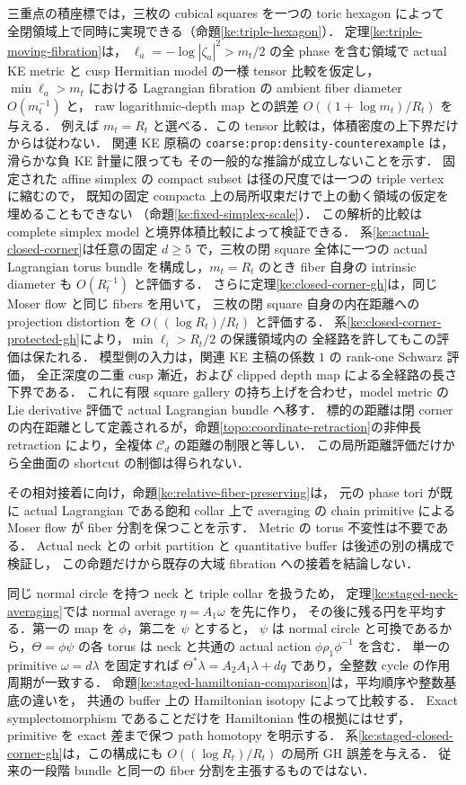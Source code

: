 三重点の積座標では，三枚の cubical squares を一つの toric hexagon によって
全閉領域上で同時に実現できる（命題\ref{ke:triple-hexagon}）．
定理\ref{ke:triple-moving-fibration}は，
$\ell_a=-\log|\zeta_a|^2>m_t/2$ の全 phase を含む領域で
actual KE metric と cusp Hermitian model の一様 tensor 比較を仮定し，
$\min\ell_a>m_t$ における Lagrangian fibration の
ambient fiber diameter $O(m_t^{-1})$ と，
raw logarithmic-depth map との誤差 $O((1+\log m_t)/R_t)$ を与える．
例えば $m_t=R_t$ と選べる．この tensor 比較は，体積密度の上下界だけからは従わない．
関連 KE 原稿\cite{KELocalCurrent}の
\texttt{coarse:prop:density-counterexample} は，滑らかな負 KE 計量に限っても
その一般的な推論が成立しないことを示す．
固定された affine simplex の compact subset は径の尺度では一つの triple vertex に縮むので，
既知の固定 compacta 上の局所収束だけで上の動く領域の仮定を埋めることもできない
（命題\ref{ke:fixed-simplex-scale}）．
この解析的比較は complete simplex model と境界体積比較によって検証できる．
系\ref{ke:actual-closed-corner}は任意の固定 $d\ge5$ で，三枚の閉 square 全体に一つの
actual Lagrangian torus bundle を構成し，$m_t=R_t$ のとき fiber 自身の intrinsic diameter も
$O(R_t^{-1})$ と評価する．
さらに定理\ref{ke:closed-corner-gh}は，同じ Moser flow と同じ fibers を用いて，
三枚の閉 square 自身の内在距離への projection distortion を
$O((\log R_t)/R_t)$ と評価する．
系\ref{ke:closed-corner-protected-gh}により，$\min\ell_i>R_t/2$ の保護領域内の
全経路を許してもこの評価は保たれる．
模型側の入力は，関連 KE 主稿の係数 $1$ の rank-one Schwarz 評価，
全正深度の二重 cusp 漸近，および clipped depth map による全経路の長さ下界である．
これに有限 square gallery の持ち上げを合わせ，model metric の Lie derivative 評価で
actual Lagrangian bundle へ移す．
標的の距離は閉 corner の内在距離として定義されるが，命題\ref{topo:coordinate-retraction}の非伸長 retraction により，全複体 $\mathcal C_d$ の距離の制限と等しい．
この局所距離評価だけから全曲面の shortcut の制御は得られない．

その相対接着に向け，命題\ref{ke:relative-fiber-preserving}は，
元の phase tori が既に actual Lagrangian である飽和 collar 上で
averaging の chain primitive による Moser flow が fiber 分割を保つことを示す．
Metric の torus 不変性は不要である．
Actual neck との orbit partition と quantitative buffer は後述の別の構成で検証し，
この命題だけから既存の大域 fibration への接着を結論しない．

同じ normal circle を持つ neck と triple collar を扱うため，
定理\ref{ke:staged-neck-averaging}では normal average $\eta=A_1\omega$ を先に作り，
その後に残る円を平均する．第一の map を $\phi$，第二を $\psi$ とすると，
$\psi$ は normal circle と可換であるから，$\Theta=\phi\psi$ の各 torus は
neck と共通の actual action $\phi\rho_1\phi^{-1}$ を含む．
単一の primitive $\omega=d\lambda$ を固定すれば
$\Theta^*\lambda=A_2A_1\lambda+dq$ であり，全整数 cycle の作用周期が一致する．
命題\ref{ke:staged-hamiltonian-comparison}は，平均順序や整数基底の違いを，
共通の buffer 上の Hamiltonian isotopy によって比較する．
Exact symplectomorphism であることだけを Hamiltonian 性の根拠にはせず，
primitive を exact 差まで保つ path homotopy を明示する．
系\ref{ke:staged-closed-corner-gh}は，この構成にも
$O((\log R_t)/R_t)$ の局所 GH 誤差を与える．
従来の一段階 bundle と同一の fiber 分割を主張するものではない．

